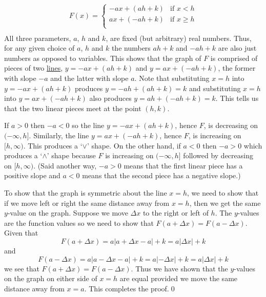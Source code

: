 \documentclass{ximera}
\begin{document}
\[\begin{array}{ccc}
F(x)   =   \begin{cases} 
   -ax + (ah + k)  & \text{if $x < h$} \\
    ax + (-ah + k)  & \text{if $x \geq h$} \\
   \end{cases} \\ 
   
   \end{array}  \] All three parameters, $a$, $h$ and $k$, are fixed (but arbitrary) real numbers.  Thus, for any given choice of $a$, $h$ and $k$ the numbers $ah + k$ and $-ah + k$ are also just numbers as opposed to variables.  This shows that the graph of $F$ is comprised of pieces of two \underline{lines}, $y = -ax + (ah + k)$ and $y = ax + (-ah + k)$, the former with slope $-a$ and the latter with slope $a$.  Note that substituting $x = h$ into $y = -ax + (ah + k)$ produces $y = -ah + (ah + k) = k$ and substituting $x = h$ into $y = ax + (-ah + k)$ also produces $y = ah + (-ah + k) = k$.  This tells us that the two linear pieces meet at the point $(h, k)$.  
	
\medskip

If $a > 0$ then $-a < 0$ so the line $y = -ax + (ah + k)$, hence $F$, is decreasing on $(-\infty, h]$.  Similarly,  the line $y = ax + (-ah + k)$, hence $F$, is increasing on $[h, \infty)$.  This produces a `$\vee$' shape.  On the other hand, if $a < 0$ then $-a > 0$ which produces a `$\wedge$' shape because $F$ is increasing on $(-\infty, h]$ followed by decreasing on $[h, \infty)$. (Said another way, $-a > 0$ means that the first linear piece has a positive slope and $a < 0$ means that the second piece has a negative slope.)

\medskip

To show that the graph is symmetric about the line $x = h$, we need to show that if we move left or right the same distance away from $x = h$, then we get the same $y$-value on the graph.  Suppose we move $\Delta x$ to the right or left of $h$.  The $y$-values are the function values so we need to show that $F(a + \Delta x) = F(a - \Delta x)$.   Given that \[F(a + \Delta x) = a| a + \Delta x - a| + k = a |\Delta x| + k\] and  \[F(a - \Delta x) = a | a - \Delta x - a| + k = a|-\Delta x| + k = a|\Delta x| + k\] we see that $F(a + \Delta x) = F(a - \Delta x)$. Thus we have shown that the $y$-values on the graph on either side of $x = h$ are equal provided we move the same distance away from $x = a$. This completes the proof.\qed

\medskip
\end{document}
